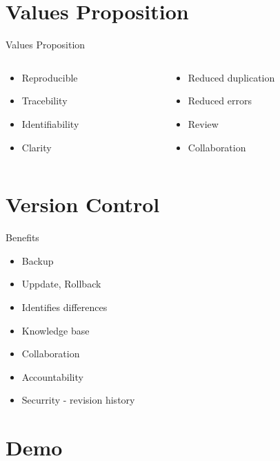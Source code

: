 \documentclass{beamer}
\begin{document}
\section{Values Proposition}
\begin{frame}{Values Proposition}
  \begin{columns}
    \begin{column}{0.5\textwidth}
      \begin{itemize}
        \item Reproducible\pause
        \item Tracebility\pause
        \item Identifiability\pause
        \item Clarity\pause
      \end{itemize}          
    \end{column}
    \begin{column}{0.5\textwidth}
      \begin{itemize}
        \item Reduced duplication\pause
        \item Reduced errors\pause
        \item Review\pause
        \item Collaboration
      \end{itemize}
    \end{column}
  \end{columns}
\end{frame}

\section{Version Control}
\begin{frame}{Benefits}
  \begin{itemize}
    \item Backup\pause
    \item Uppdate, Rollback\pause
    \item Identifies differences\pause
    \item Knowledge base\pause
    \item Collaboration\pause
    \item Accountability \pause
    \item Securrity - revision history
  \end{itemize}
\end{frame}

\section{Demo}
\end{document}
